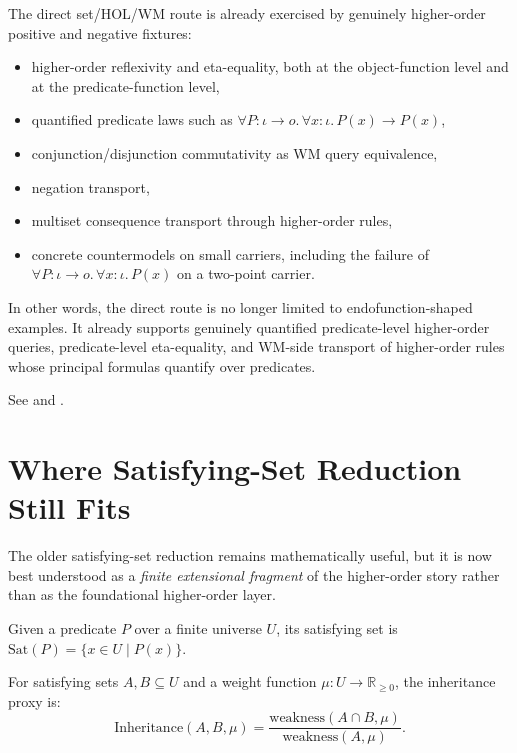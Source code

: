 \documentclass[11pt,openany]{report}
\begin{document}
The direct set/HOL/WM route is already exercised by genuinely higher-order
positive and negative fixtures:
\begin{itemize}
\item higher-order reflexivity and eta-equality, both at the object-function
  level and at the predicate-function level,
\item quantified predicate laws such as
  $\forall P:\iota \to o.\,\forall x:\iota.\, P(x)\to P(x)$,
\item conjunction/disjunction commutativity as WM query equivalence,
\item negation transport,
\item multiset consequence transport through higher-order rules,
\item concrete countermodels on small carriers, including the failure of
  $\forall P:\iota \to o.\,\forall x:\iota.\, P(x)$ on a two-point carrier.
\end{itemize}

In other words, the direct route is no longer limited to endofunction-shaped
examples.  It already supports genuinely quantified predicate-level higher-order
queries, predicate-level eta-equality, and WM-side transport of higher-order
rules whose principal formulas quantify over predicates.

See
 and
.

\section{Where Satisfying-Set Reduction Still Fits}

The older satisfying-set reduction remains mathematically useful, but it is
now best understood as a \emph{finite extensional fragment} of the higher-order
story rather than as the foundational higher-order layer.

\begin{definition}
Given a predicate $P$ over a finite universe $U$, its satisfying set is
$\mathrm{Sat}(P) = \{x \in U \mid P(x)\}$.
\end{definition}

\begin{definition}
For satisfying sets $A, B \subseteq U$ and a weight function
$\mu : U \to \mathbb{R}_{\ge 0}$, the inheritance proxy is:
\[
  \mathrm{Inheritance}(A, B, \mu) =
  \frac{\mathrm{weakness}(A \cap B, \mu)}{\mathrm{weakness}(A, \mu)}.
\]
\end{definition}
\end{document}
